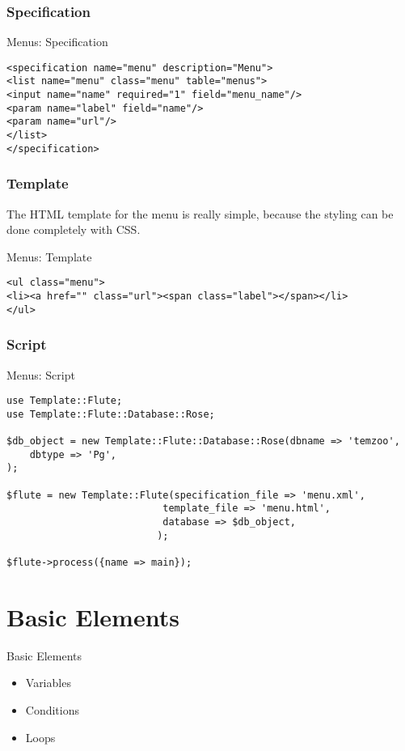 \subsubsection{Specification}
\begin{frame}[fragile]{Menus: Specification}
\begin{lstlisting}
<specification name="menu" description="Menu">
<list name="menu" class="menu" table="menus">
<input name="name" required="1" field="menu_name"/>
<param name="label" field="name"/>
<param name="url"/>
</list>
</specification>
\end{lstlisting}
\end{frame}

\subsubsection{Template}
The HTML template for the menu is really simple, because the
styling can be done completely with CSS.

\begin{frame}[fragile]{Menus: Template}
\begin{lstlisting}
<ul class="menu">
<li><a href="" class="url"><span class="label"></span></li>
</ul>
\end{lstlisting}
\end{frame}

\subsubsection{Script}
\begin{frame}[fragile]{Menus: Script}
\begin{lstlisting}
use Template::Flute;
use Template::Flute::Database::Rose;

$db_object = new Template::Flute::Database::Rose(dbname => 'temzoo',
    dbtype => 'Pg',
);

$flute = new Template::Flute(specification_file => 'menu.xml',
						   template_file => 'menu.html',
						   database => $db_object,
						  );

$flute->process({name => main});
\end{lstlisting}
\end{frame}

\section{Basic Elements}
\begin{frame}{Basic Elements}
\begin{itemize}
\item Variables
\item Conditions
\item Loops
\end{itemize}
\end{frame}


